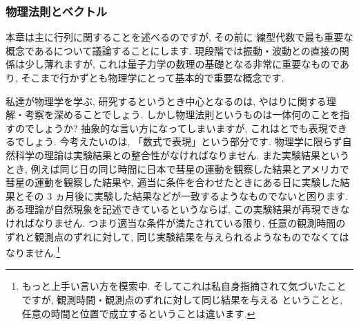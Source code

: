 \documentclass[openany, a4paper, oneside]{book}
\theoremstyle{break}
\theoremstyle{breakdefn}
\begin{document}
\subsubsection{物理法則とベクトル}
\label{sec-4-3-2-3-1}

本章は主に行列に関することを述べるのですが, その前に
線型代数で最も重要な概念であるについて議論することにします.
現段階では振動・波動との直接の関係は少し薄れますが,
これは量子力学の数理の基礎となる非常に重要なものであり,
そこまで行かずとも物理学にとって基本的で重要な概念です.

私達が物理学を学ぶ, 研究するというとき中心となるのは,
やはりに関する理解・考察を深めることでしょう.
しかし物理法則というものは一体何のことを指すのでしょうか?
抽象的な言い方になってしまいますが,
これはとでも表現できるでしょう.
今考えたいのは, 「数式で表現」という部分です.
物理学に限らず自然科学の理論は実験結果との整合性がなければなりません.
また実験結果というとき, 例えば同じ日の同じ時間に日本で彗星の運動を観察した結果とアメリカで彗星の運動を観察した結果や,
適当に条件を合わせたときにある日に実験した結果とその 3 ヵ月後に実験した結果などが一致するようなものでないと困ります.
ある理論が自然現象を記述できているというならば, この実験結果が再現できなければなりません.
つまり適当な条件が満たされている限り,
任意の観測時間のずれと観測点のずれに対して, 同じ実験結果を与えられるようなものでなくてはなりません.\footnote{もっと上手い言い方を模索中.
そしてこれは私自身指摘されて気づいたことですが, 観測時間・観測点のずれに対して同じ結果を与える
ということと, 任意の時間と位置で成立するということは違います.
 }
\end{document}

